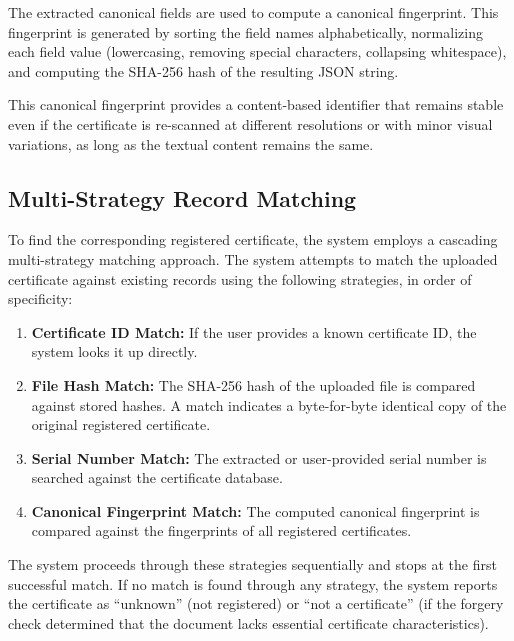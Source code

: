         The extracted canonical fields are used to compute a canonical fingerprint. This fingerprint is generated by sorting the field names alphabetically, normalizing each field value (lowercasing, removing special characters, collapsing whitespace), and computing the SHA-256 hash of the resulting JSON string.
        
        This canonical fingerprint provides a content-based identifier that remains stable even if the certificate is re-scanned at different resolutions or with minor visual variations, as long as the textual content remains the same.
    
    \subsection{Multi-Strategy Record Matching}
    \label{sec:multi_strategy_matching}

        To find the corresponding registered certificate, the system employs a cascading multi-strategy matching approach. The system attempts to match the uploaded certificate against existing records using the following strategies, in order of specificity:
        
        \begin{enumerate}
            \item \textbf{Certificate ID Match:} If the user provides a known certificate ID, the system looks it up directly.
        
            \item \textbf{File Hash Match:} The SHA-256 hash of the uploaded file is compared against stored hashes. A match indicates a byte-for-byte identical copy of the original registered certificate.
        
            \item \textbf{Serial Number Match:} The extracted or user-provided serial number is searched against the certificate database.
        
            \item \textbf{Canonical Fingerprint Match:} The computed canonical fingerprint is compared against the fingerprints of all registered certificates.
        \end{enumerate}
        
        The system proceeds through these strategies sequentially and stops at the first successful match. If no match is found through any strategy, the system reports the certificate as ``unknown'' (not registered) or ``not a certificate'' (if the forgery check determined that the document lacks essential certificate characteristics).
        
